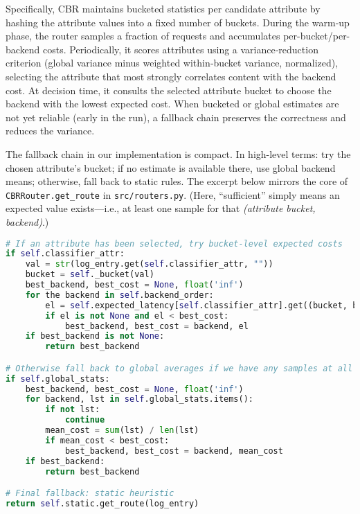 Specifically, CBR maintains bucketed statistics per candidate attribute by hashing the attribute values into a fixed number of buckets. During the warm‑up phase, the router samples a fraction of requests and accumulates per-bucket/per-backend costs. Periodically, it scores attributes using a variance‑reduction criterion (global variance minus weighted within‑bucket variance, normalized), selecting the attribute that most strongly correlates content with the backend cost. At decision time, it consults the selected attribute bucket to choose the backend with the lowest expected cost. When bucketed or global estimates are not yet reliable (early in the run), a fallback chain preserves the correctness and reduces the variance.

The fallback chain in our implementation is compact. In high-level terms: try the chosen attribute’s bucket; if no estimate is available there, use global backend means; otherwise, fall back to static rules. The excerpt below mirrors the core of \texttt{CBRRouter.get\_route} in \texttt{src/routers.py}. (Here, “sufficient” simply means an expected value exists—i.e., at least one sample for that \emph{(attribute bucket, backend)}.)

\begin{lstlisting}[language=Python, caption={CBR fallback (excerpt from src/routers.py, CBRRouter.get\_route)}]
# If an attribute has been selected, try bucket-level expected costs
if self.classifier_attr:
    val = str(log_entry.get(self.classifier_attr, ""))
    bucket = self._bucket(val)
    best_backend, best_cost = None, float('inf')
    for the backend in self.backend_order:
        el = self.expected_latency[self.classifier_attr].get((bucket, backend))
        if el is not None and el < best_cost:
            best_backend, best_cost = backend, el
    if best_backend is not None:
        return best_backend

# Otherwise fall back to global averages if we have any samples at all
if self.global_stats:
    best_backend, best_cost = None, float('inf')
    for backend, lst in self.global_stats.items():
        if not lst:
            continue
        mean_cost = sum(lst) / len(lst)
        if mean_cost < best_cost:
            best_backend, best_cost = backend, mean_cost
    if best_backend:
        return best_backend

# Final fallback: static heuristic
return self.static.get_route(log_entry)
\end{lstlisting}


